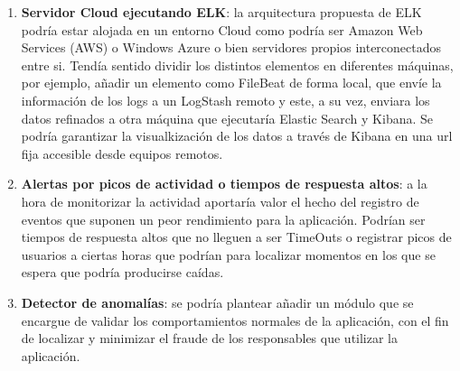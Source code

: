 \begin{enumerate}
\item \textbf{Servidor Cloud ejecutando ELK}: la arquitectura propuesta de ELK podría estar alojada en un entorno Cloud como podría ser Amazon Web Services (AWS) o Windows Azure o bien servidores propios interconectados entre si. Tendía sentido dividir los distintos elementos en diferentes máquinas, por ejemplo, añadir un elemento como FileBeat de forma local, que envíe la información de los logs a un LogStash remoto y este, a su vez, enviara los datos refinados a otra máquina que ejecutaría Elastic Search y Kibana. Se podría garantizar la visualkización de los datos a través de Kibana en una url fija accesible desde equipos remotos.
\item \textbf{Alertas por picos de actividad o tiempos de respuesta altos}: a la hora de monitorizar la actividad aportaría valor el hecho del registro de eventos que suponen un peor rendimiento para la aplicación. Podrían ser tiempos de respuesta altos que no lleguen a ser TimeOuts o registrar picos de usuarios a ciertas horas que podrían para localizar momentos en los que se espera que podría producirse caídas.
\item \textbf{Detector de anomalías}: se podría plantear añadir un módulo que se encargue de validar los comportamientos normales de la aplicación, con el fin de localizar y minimizar el fraude de los responsables que utilizar la aplicación. 
\end{enumerate}
